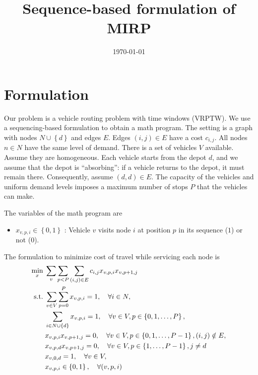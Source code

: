 \documentclass[11pt]{article}
\title{Sequence-based formulation of MIRP}
\date{\today}
\theoremstyle{definition}
\newcommand{\st}{\mathrm{s.t.}\;}
\newcommand{\set}[1]{\left\{ #1 \right\}}
\newcommand{\0}{\mathbf{0}}
\begin{document}
\maketitle
\section{Formulation}

Our problem is a vehicle routing problem with time windows (VRPTW).
We use a sequencing-based formulation to obtain a math program.
The setting is a graph with nodes $N \cup \set{d}$ and edges $E$.
Edges $(i,j) \in E$ have a cost $c_{i,j}$.
All nodes $n \in N$ have the same level of demand.
There is a set of vehicles $V$ available.
Assume they are homogeneous.
Each vehicle starts from the depot $d$, and we assume that the depot is ``absorbing'':
if a vehicle returns to the depot, it must remain there.
Consequently, assume $(d,d) \in E$.
The capacity of the vehicles and uniform demand levels imposes a maximum number of stops $P$ that the vehicles can make.

The variables of the math program are
\begin{itemize}
\item $x_{v,p,i} \in \set{0,1}$ : Vehicle $v$ visits node $i$ at position $p$ in its sequence ($1$) or not ($0$).
\end{itemize}


The formulation to minimize cost of travel while servicing each node is
\begin{align}
\min_x\; & \sum_v \sum_{p < P} \sum_{(i,j) \in E} c_{i,j} x_{v,p,i} x_{v,p+1,j} \\
\st
&\label{con:1}  \sum_{v \in V} \sum_{p=0}^P x_{v,p,i} = 1, \quad \forall i \in N, \\
&\label{con:2}  \sum_{i \in N \cup \set{d}} x_{v,p,i} = 1, \quad \forall v \in V, p \in \set{0,1,\dots,P}, \\
&\label{con:3}  x_{v,p,i} x_{v,p+1,j} = 0, \quad \forall v \in V, p \in \set{0,1,\dots,P-1}, (i,j) \notin E, \\
&\label{con:35} x_{v,p,d} x_{v,p+1,j} = 0, \quad \forall v \in V, p \in \set{1,\dots,P-1}, j \ne d\\
&\label{con:4}  x_{v,0,d} = 1, \quad \forall v \in V, \\
&\notag         x_{v,p,i} \in \set{0,1}, \quad \forall (v,p,i)
\end{align}
\end{document}

